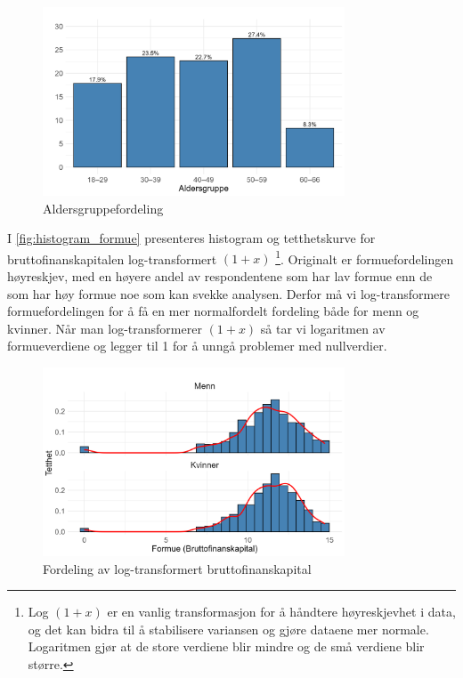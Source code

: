 \documentclass[
  12pt,
  a4paper,
  DIV=11,
  numbers=noendperiod]{scrartcl}
\begin{document}
\begin{figure}[H]
\caption{Aldersgruppefordeling}
\label{fig:barplot}
\centering
\includegraphics[width=0.8\textwidth]{dokumentobjekter/figurer/fig_3.png}
\end{figure}

I \autoref{fig:histogram_formue} presenteres histogram og tetthetskurve
for bruttofinanskapitalen log-transformert \((1 + x)\) \footnote{Log
  \((1 + x)\) er en vanlig transformasjon for å håndtere høyreskjevhet i
  data, og det kan bidra til å stabilisere variansen og gjøre dataene
  mer normale. Logaritmen gjør at de store verdiene blir mindre og de
  små verdiene blir større.}. Originalt er formuefordelingen høyreskjev,
med en høyere andel av respondentene som har lav formue enn de som har
høy formue noe som kan svekke analysen. Derfor må vi log-transformere
formuefordelingen for å få en mer normalfordelt fordeling både for menn
og kvinner. Når man log-transformerer \((1 + x)\) så tar vi logaritmen
av formueverdiene og legger til 1 for å unngå problemer med nullverdier.

\begin{figure}[H]
\caption{Fordeling av log-transformert bruttofinanskapital}
\label{fig:histogram_formue}
\centering
\includegraphics[width=0.8\textwidth]{dokumentobjekter/figurer/fig_4.png}
\end{figure}
\end{document}

